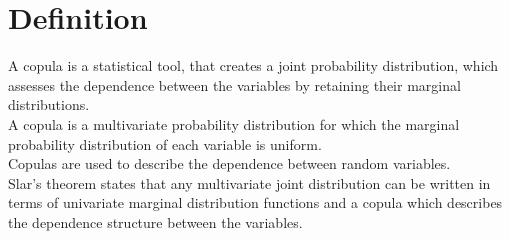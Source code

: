 \section{Definition}
A copula is a statistical tool, that creates a joint probability distribution, which assesses the dependence between the variables by retaining their marginal distributions.\\
A copula is a multivariate probability distribution for which the marginal probability distribution of each variable is uniform.\\
Copulas are used to describe the dependence between random variables.\\
Slar's theorem states that any multivariate joint distribution can be written in terms of univariate marginal distribution functions and a copula which describes the dependence structure between the variables.